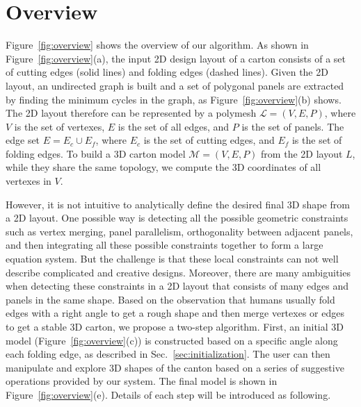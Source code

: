 \section{Overview}\label{sec:overview}


Figure~\ref{fig:overview} shows the overview of our algorithm. 
As shown in Figure~\ref{fig:overview}(a), the input 2D design layout of a carton consists of a set of cutting edges (solid lines) and folding edges (dashed lines).
%
Given the 2D layout, an undirected graph is built and a set of polygonal panels are extracted by finding the minimum cycles in the graph, as Figure~\ref{fig:overview}(b) shows. 
The 2D layout therefore can be represented by a polymesh $\mathcal{L}=(V,E,P)$, where $V$ is the set of vertexes, $E$ is the set of all edges, and $P$ is the set of panels. 
The edge set $E=E_c\cup E_f$, where $E_c$ is the set of cutting edges, and $E_f$ is the set of folding edges.
%
To build a 3D carton model $\mathcal{M}=(V, E, P)$ from the 2D layout $L$, while they share the same topology, we compute the 3D coordinates of all vertexes in $V$. 
%

However, it is not intuitive to analytically define the desired final 3D shape from a 2D layout. 
One possible way is detecting all the possible geometric constraints such as vertex merging, panel parallelism, orthogonality between adjacent panels, and then integrating all these possible constraints together to form a large equation system. 
But the challenge is that these local constraints can not well describe complicated and creative designs. 
Moreover, there are many ambiguities when detecting these constraints in a 2D layout that consists of many edges and panels in the same shape. 
%
Based on the observation that humans usually fold edges with a right angle to get a rough shape and then merge vertexes or edges to get a stable 3D carton, we propose a two-step algorithm. 
First, an initial 3D model (Figure~\ref{fig:overview}(c)) is constructed based on a specific angle along each folding edge, as described in Sec.~\ref{sec:initialization}.
The user can then manipulate and explore 3D shapes of the canton based on a series of suggestive operations provided by our system. 
%
The final model is shown in Figure~\ref{fig:overview}(e).
Details of each step will be introduced as following. 



